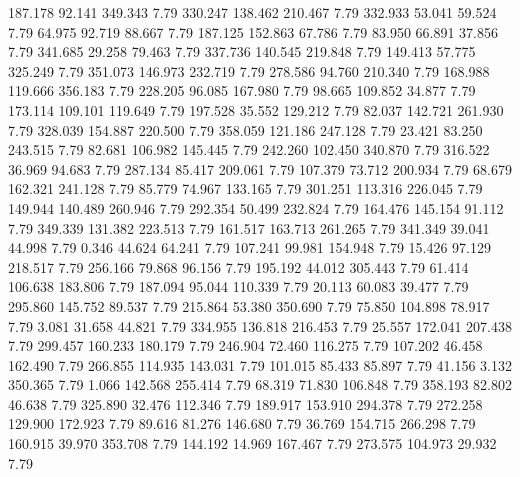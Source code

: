  187.178   92.141  349.343         7.79
 330.247  138.462  210.467         7.79
 332.933   53.041   59.524         7.79
  64.975   92.719   88.667         7.79
 187.125  152.863   67.786         7.79
  83.950   66.891   37.856         7.79
 341.685   29.258   79.463         7.79
 337.736  140.545  219.848         7.79
 149.413   57.775  325.249         7.79
 351.073  146.973  232.719         7.79
 278.586   94.760  210.340         7.79
 168.988  119.666  356.183         7.79
 228.205   96.085  167.980         7.79
  98.665  109.852   34.877         7.79
 173.114  109.101  119.649         7.79
 197.528   35.552  129.212         7.79
  82.037  142.721  261.930         7.79
 328.039  154.887  220.500         7.79
 358.059  121.186  247.128         7.79
  23.421   83.250  243.515         7.79
  82.681  106.982  145.445         7.79
 242.260  102.450  340.870         7.79
 316.522   36.969   94.683         7.79
 287.134   85.417  209.061         7.79
 107.379   73.712  200.934         7.79
  68.679  162.321  241.128         7.79
  85.779   74.967  133.165         7.79
 301.251  113.316  226.045         7.79
 149.944  140.489  260.946         7.79
 292.354   50.499  232.824         7.79
 164.476  145.154   91.112         7.79
 349.339  131.382  223.513         7.79
 161.517  163.713  261.265         7.79
 341.349   39.041   44.998         7.79
   0.346   44.624   64.241         7.79
 107.241   99.981  154.948         7.79
  15.426   97.129  218.517         7.79
 256.166   79.868   96.156         7.79
 195.192   44.012  305.443         7.79
  61.414  106.638  183.806         7.79
 187.094   95.044  110.339         7.79
  20.113   60.083   39.477         7.79
 295.860  145.752   89.537         7.79
 215.864   53.380  350.690         7.79
  75.850  104.898   78.917         7.79
   3.081   31.658   44.821         7.79
 334.955  136.818  216.453         7.79
  25.557  172.041  207.438         7.79
 299.457  160.233  180.179         7.79
 246.904   72.460  116.275         7.79
 107.202   46.458  162.490         7.79
 266.855  114.935  143.031         7.79
 101.015   85.433   85.897         7.79
  41.156    3.132  350.365         7.79
   1.066  142.568  255.414         7.79
  68.319   71.830  106.848         7.79
 358.193   82.802   46.638         7.79
 325.890   32.476  112.346         7.79
 189.917  153.910  294.378         7.79
 272.258  129.900  172.923         7.79
  89.616   81.276  146.680         7.79
  36.769  154.715  266.298         7.79
 160.915   39.970  353.708         7.79
 144.192   14.969  167.467         7.79
 273.575  104.973   29.932         7.79

